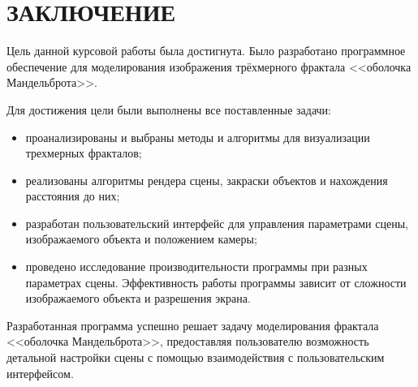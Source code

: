 \section*{ЗАКЛЮЧЕНИЕ}

Цель данной курсовой работы была достигнута. Было разработано программное обеспечение
для моделирования изображения трёхмерного фрактала <<оболочка Мандельброта>>.

Для достижения цели были выполнены все поставленные задачи:

\begin{itemize}
  \item проанализированы и выбраны методы и алгоритмы для визуализации трехмерных
    фракталов;
  \item реализованы алгоритмы рендера сцены, закраски объектов и нахождения расстояния до них;
  \item разработан пользовательский интерфейс для управления параметрами сцены,
    изображаемого объекта и положением камеры;
  \item проведено исследование производительности программы при разных параметрах сцены.
    Эффективность работы программы зависит от сложности изображаемого объекта и разрешения экрана.
\end{itemize}

Разработанная программа успешно решает задачу моделирования фрактала <<оболочка Мандельброта>>,
предоставляя пользователю возможность детальной настройки сцены с помощью взаимодействия
с пользовательским интерфейсом.
